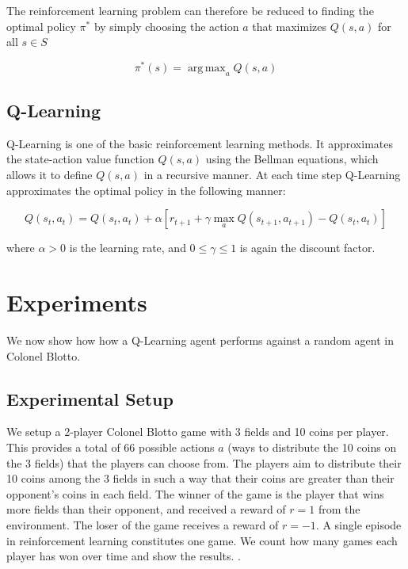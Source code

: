 \documentclass[11pt, oneside]{article}   	%
\DeclareMathOperator*{\argmax}{arg\,max}
\begin{document}
The reinforcement learning problem can therefore be reduced to finding the optimal policy $\pi^*$ by simply choosing the action $a$ that maximizes $Q(s,a)$ for all $s \in S$ 

\begin{equation}
\pi^*(s) = \argmax_a{Q(s,a)}
\end{equation}
\subsection{Q-Learning}

Q-Learning is one of the basic reinforcement learning methods. It approximates the state-action value function $Q(s,a)$ using the Bellman equations, which allows it to define $Q(s,a)$ in a recursive manner. At each time step Q-Learning approximates the optimal policy in the following manner:

\begin{equation}
Q(s_t, a_t) = Q(s_t, a_t) + \alpha[r_{t+1} + \gamma \max_aQ(s_{t+1}, a_{t+1}) - Q(s_t, a_t)]
\end{equation}

where $\alpha > 0$ is the learning rate, and $0 \leq \gamma \leq 1$ is again the discount factor.

\section{Experiments}

We now show how how a Q-Learning agent performs against a random agent in Colonel Blotto.

\subsection{Experimental Setup}

We setup a 2-player Colonel Blotto game with 3 fields and 10 coins per player. This provides a total of 66 possible actions $a$ (ways to distribute the 10 coins on the 3 fields) that the players can choose from. The players aim to distribute their 10 coins among the 3 fields in such a way that their coins are greater than their opponent's coins in each field. The winner of the game is the player that wins more fields than their opponent, and received a reward of $r=1$ from the environment. The loser of the game receives a reward of $r=-1$. A single episode in reinforcement learning constitutes one game. We count how many games each player has won over time and show the results. .
\end{document}
